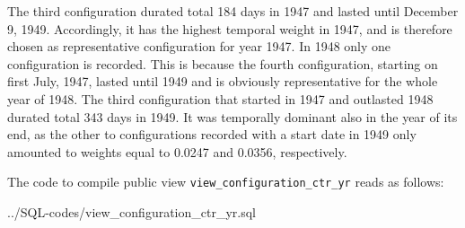The third configuration durated total 184 days in 1947 and lasted until December 9, 1949. Accordingly, it has the highest temporal weight in 1947, and is therefore chosen as representative configuration for year 1947.%
In 1948 only one configuration is recorded. This is because the fourth configuration, starting on first July, 1947, lasted until 1949 and is obviously representative for the whole year of 1948. 
The third configuration that started in 1947 and outlasted 1948 durated total 343 days in 1949. 
It was temporally dominant also in the year of its end, as the other to configurations recorded with a start date in 1949 only amounted to weights equal to 0.0247 and 0.0356, respectively.

The code to compile public view \texttt{\footnotesize view\_configuration\_ctr\_yr} reads as follows:

%
{../SQL-codes/view_configuration_ctr_yr.sql}





